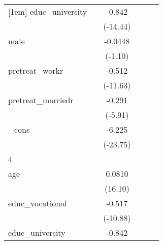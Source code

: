 {\begin{tabular}{l*{5}{c}}
[1em]
educ\_university&                     &      -0.842\sym{***}&                     &                     &                     \\
            &                     &    (-14.44)         &                     &                     &                     \\
[1em]
male        &                     &     -0.0448         &                     &                     &                     \\
            &                     &     (-1.10)         &                     &                     &                     \\
[1em]
pretreat\_workr&                     &      -0.512\sym{***}&                     &                     &                     \\
            &                     &    (-11.63)         &                     &                     &                     \\
[1em]
pretreat\_marriedr&                     &      -0.291\sym{***}&                     &                     &                     \\
            &                     &     (-5.91)         &                     &                     &                     \\
[1em]
\_cons      &                     &      -6.225\sym{***}&                     &                     &                     \\
            &                     &    (-23.75)         &                     &                     &                     \\
\hline
4           &                     &                     &                     &                     &                     \\
age         &                     &      0.0810\sym{***}&                     &                     &                     \\
            &                     &     (16.10)         &                     &                     &                     \\
[1em]
educ\_vocational&                     &      -0.517\sym{***}&                     &                     &                     \\
            &                     &    (-10.88)         &                     &                     &                     \\
[1em]
educ\_university&                     &      -0.842\sym{***}&                     &                     &                     \\

\end{tabular}}
